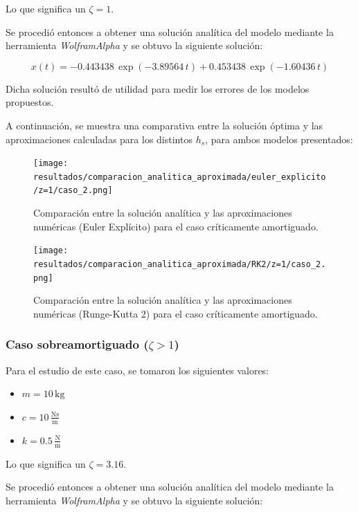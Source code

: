 \documentclass[titlepage,a4paper]{article}
\begin{document}
Lo que significa un $\zeta = 1$.

Se procedió entonces a obtener una solución analítica del modelo mediante la herramienta \textit{WolframAlpha} y se obtuvo la siguiente solución:

\[
x(t) = -0.443438\,\exp\left(-3.89564\,t\right) + 0.453438\,\exp\left(-1.60436\,t\right)
\]

Dicha solución resultó de utilidad para medir los errores de los modelos propuestos.

A continuación, se muestra una comparativa entre la solución óptima y las aproximaciones calculadas para los distintos $h_s$, para ambos modelos presentados:

\begin{figure}[H]
  \centering
  \texttt{[image: resultados/comparacion\_analitica\_aproximada/euler\_explicito/z=1/caso\_2.png]}
  \caption{Comparación entre la solución analítica y las aproximaciones numéricas (Euler Explícito) para el caso críticamente amortiguado.}
\end{figure}

\begin{figure}[H]
  \centering
  \texttt{[image: resultados/comparacion\_analitica\_aproximada/RK2/z=1/caso\_2.png]}
  \caption{Comparación entre la solución analítica y las aproximaciones numéricas (Runge-Kutta 2) para el caso críticamente amortiguado.}
\end{figure}


\subsubsection{Caso sobreamortiguado ($\zeta > 1$)}

Para el estudio de este caso, se tomaron los siguientes valores:

\begin{itemize}
    \item $m = 10\,\text{kg}$
    \item $c = 10\,\frac{\text{Ns}}{\text{m}}$
    \item $k = 0.5\,\frac{\text{N}}{\text{m}}$
\end{itemize}

Lo que significa un $\zeta = 3.16$.

Se procedió entonces a obtener una solución analítica del modelo mediante la herramienta \textit{WolframAlpha} y se obtuvo la siguiente solución:
\end{document}

